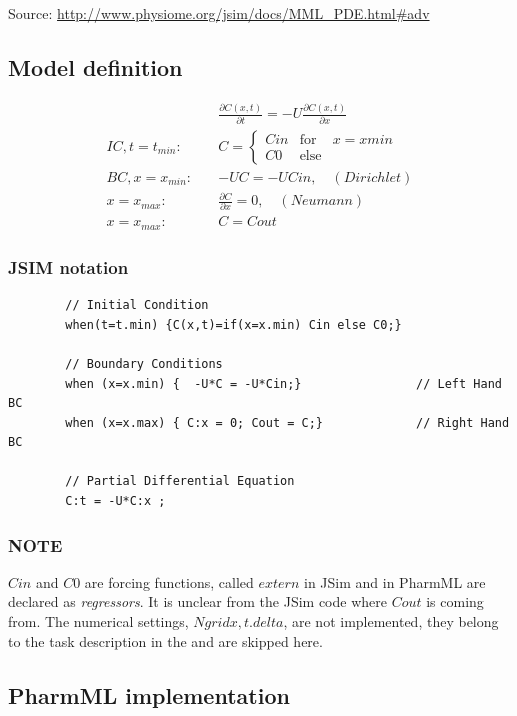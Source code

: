 Source: \url{http://www.physiome.org/jsim/docs/MML_PDE.html#adv}

\subsection*{Model definition}

\begin{align}
& \frac{\partial C(x,t)}{\partial t}  = - U \frac{\partial C(x,t)}{\partial x} \nonumber \\
IC, t=t_{min}: \quad & C =  \left\{ \begin{array}{rcl}  Cin & \mbox{for} & x = xmin \\ 
C0 & \mbox{else} \end{array}\right. \nonumber \\
BC, x=x_{min}: \quad & -U C = -U Cin, \quad (Dirichlet) \nonumber \\
	x=x_{max}: \quad & \frac{\partial C}{\partial x} = 0 , \quad (Neumann) \nonumber \\
	x=x_{max}: \quad & C = Cout \nonumber 
\end{align}


\subsubsection*{JSIM notation}

\lstset{language=MLX}
\begin{lstlisting}
        // Initial Condition
        when(t=t.min) {C(x,t)=if(x=x.min) Cin else C0;}
        
        // Boundary Conditions
        when (x=x.min) {  -U*C = -U*Cin;}                // Left Hand BC
        when (x=x.max) { C:x = 0; Cout = C;}             // Right Hand BC
        
        // Partial Differential Equation
        C:t = -U*C:x ;
\end{lstlisting}

\bigskip
\subsubsection*{NOTE}
$Cin$ and $C0$ are forcing functions, called $extern$ in JSim and in PharmML are 
declared as \textit{regressors}. It is unclear from the JSim code where $Cout$ is coming from.
The numerical settings, $Ngridx, t.delta$, are not implemented, they belong to 
the task description in the  and are skipped here.

\subsection*{PharmML implementation}

